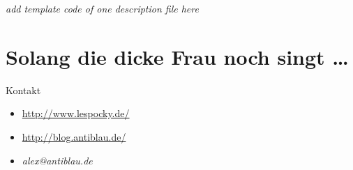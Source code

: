\documentclass[hyperref={pdfpagelabels=false}]{beamer}
\begin{document}
\begin{frame}
    \emph{add template code of one description file here}
\end{frame}

\section{Solang die dicke Frau noch singt \dots}

\begin{frame}{Kontakt}
    \begin{itemize}
        \item \url{http://www.lespocky.de/}
        \item \url{http://blog.antiblau.de/}
        \item \emph{alex@antiblau.de}
    \end{itemize}
\end{frame}
\end{document}
